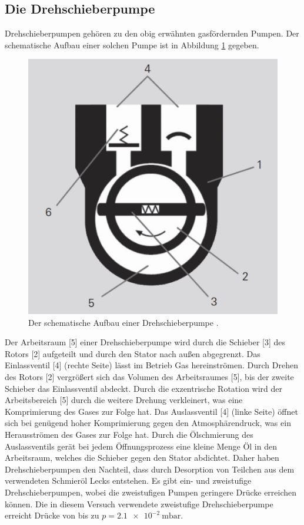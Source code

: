 \subsection{Die Drehschieberpumpe}
Drehschieberpumpen gehören zu den obig erwähnten gasfördernden Pumpen. Der schematische
Aufbau einer solchen Pumpe ist in Abbildung \ref{fig:drehschieber} gegeben.
\begin{figure}[H]
  \centering
  \caption{Der schematische Aufbau einer Drehschieberpumpe \cite{pfeiffer}.}
  \label{fig:drehschieber}
  \includegraphics[scale=0.3]{pictures/drehschieber.png}
\end{figure}
\noindent
Der Arbeitsraum [5] einer Drehschieberpumpe wird durch die Schieber [3] des
Rotors [2] aufgeteilt und durch den Stator nach außen abgegrenzt.
Das Einlassventil [4] (rechte Seite) lässt im Betrieb Gas hereinströmen.
Durch Drehen des Rotors [2] vergrößert sich das Volumen des Arbeitsraumes [5], bis der zweite Schieber
das Einlassventil abdeckt. Durch die exzentrische Rotation wird der Arbeitsbereich [5] durch die
weitere Drehung verkleinert, was eine Komprimierung des Gases zur Folge hat. Das Auslassventil [4] (linke Seite)
öffnet sich bei genügend hoher Komprimierung gegen den Atmosphärendruck, was ein Herausströmen des Gases zur
Folge hat. Durch die Ölschmierung des Auslassventils gerät bei jedem Öffnungsprozess eine
kleine Menge Öl in den Arbeitsraum, welches die Schieber gegen den Stator abdichtet. Daher haben
Drehschieberpumpen den Nachteil, dass durch Desorption von Teilchen aus dem verwendeten Schmieröl Lecks
entstehen. Es gibt ein- und
zweistufige Drehschieberpumpen, wobei die zweistufigen Pumpen geringere Drücke erreichen können.
Die in diesem Versuch verwendete zweistufige Drehschieberpumpe erreicht Drücke
von bis zu $p = \SI{2.1 e-2}{\milli\bar}$.

